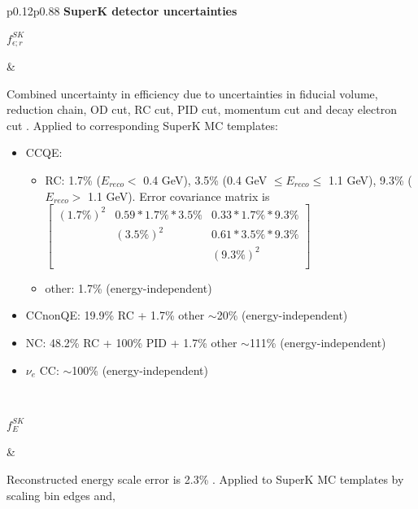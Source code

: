 \begin{table}[htb]
\center
\renewcommand{\arraystretch}{1.75} %
\begin{tabular}{p{}p{}}
%
%
\hline
{} { {\bf SuperK detector uncertainties} } \\
\hline
\parbox{0.12\textwidth}
{
   $f_{\epsilon;r}^{SK}$  
}&
\parbox{0.88\textwidth}
{
    \vspace{0.2cm}
    Combined uncertainty in efficiency due to uncertainties in fiducial volume, reduction chain, 
    OD cut, RC cut, PID cut, momentum cut and decay electron cut \cite{UpdatedSuperkEfficiencyErrors}.
    Applied to corresponding SuperK MC templates:
    \begin{itemize}
     \item CCQE: 
         \begin{itemize}
            \item RC: 1.7\% ($E_{reco}<$ 0.4 GeV), 3.5\% (0.4 GeV $\leq E_{reco} \leq$ 1.1 GeV), 9.3\% ($E_{reco}>$ 1.1 GeV). 
                  Error covariance matrix is
                  $
                   \left[
                     {\begin{array}{ccc}
                       (1.7\%)^2  &   0.59 * 1.7\% * 3.5\%  &  0.33 * 1.7\% * 9.3\% \\
                                  &   (3.5\%)^2             &  0.61 * 3.5\% * 9.3\% \\
                                  &                         &  (9.3\%)^2            \\
                      \end{array} }
                   \right]
                  $
            \item other: 1.7\% (energy-independent)
         \end{itemize}
     \item CCnonQE: 19.9\% RC + 1.7\% other $\sim$20\% (energy-independent)
     \item NC: 48.2\% RC + 100\% PID + 1.7\% other  $\sim$111\% (energy-independent)
     \item $\nu_{e}$ CC: $\sim$100\% (energy-independent)
    \end{itemize}
}\\
\parbox{0.12\textwidth}
{
   $f_{E}^{SK}$  
}&
\parbox{0.88\textwidth}
{
    \vspace{0.2cm}
    Reconstructed energy scale error is 2.3\% \cite{UpdatedSuperkEnergyScaleError}. 
    Applied to SuperK MC templates by scaling bin edges and,
}
\end{tabular}
\end{table}

